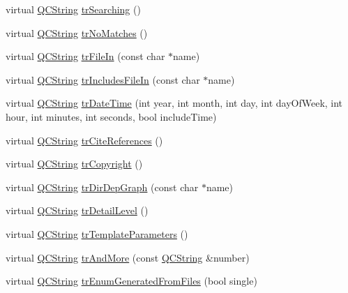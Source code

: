 \begin{DoxyCompactItemize}
\item 
virtual \mbox{\hyperlink{class_q_c_string}{Q\+C\+String}} \mbox{\hyperlink{class_translator_german_a725087ef72c6af5da0bf3072ee09be8b}{tr\+Searching}} ()
\item 
virtual \mbox{\hyperlink{class_q_c_string}{Q\+C\+String}} \mbox{\hyperlink{class_translator_german_a9e9d15260ea7a7f3bf70d315088e75a5}{tr\+No\+Matches}} ()
\item 
virtual \mbox{\hyperlink{class_q_c_string}{Q\+C\+String}} \mbox{\hyperlink{class_translator_german_a398ba2ade80d8a8f9bbef1d91f8406cd}{tr\+File\+In}} (const char $\ast$name)
\item 
virtual \mbox{\hyperlink{class_q_c_string}{Q\+C\+String}} \mbox{\hyperlink{class_translator_german_a98a9d1fbee548039b81bf697cff4519e}{tr\+Includes\+File\+In}} (const char $\ast$name)
\item 
virtual \mbox{\hyperlink{class_q_c_string}{Q\+C\+String}} \mbox{\hyperlink{class_translator_german_a4fa0e3cf73ad2b63a6c475156201408b}{tr\+Date\+Time}} (int year, int month, int day, int day\+Of\+Week, int hour, int minutes, int seconds, bool include\+Time)
\item 
virtual \mbox{\hyperlink{class_q_c_string}{Q\+C\+String}} \mbox{\hyperlink{class_translator_german_a1125598ba94e63c406d69ca023105f68}{tr\+Cite\+References}} ()
\item 
virtual \mbox{\hyperlink{class_q_c_string}{Q\+C\+String}} \mbox{\hyperlink{class_translator_german_a13ee81537aed375dfc8abc9d5e3c380f}{tr\+Copyright}} ()
\item 
virtual \mbox{\hyperlink{class_q_c_string}{Q\+C\+String}} \mbox{\hyperlink{class_translator_german_ae830a2c9591c04c380c62b5739804799}{tr\+Dir\+Dep\+Graph}} (const char $\ast$name)
\item 
virtual \mbox{\hyperlink{class_q_c_string}{Q\+C\+String}} \mbox{\hyperlink{class_translator_german_af424459fd7a15e7a67a74ea2db13d682}{tr\+Detail\+Level}} ()
\item 
virtual \mbox{\hyperlink{class_q_c_string}{Q\+C\+String}} \mbox{\hyperlink{class_translator_german_ab94de36fa089331344a018336ad468d4}{tr\+Template\+Parameters}} ()
\item 
virtual \mbox{\hyperlink{class_q_c_string}{Q\+C\+String}} \mbox{\hyperlink{class_translator_german_a33603e7bd7ea2c17613d4ea92bf2a61b}{tr\+And\+More}} (const \mbox{\hyperlink{class_q_c_string}{Q\+C\+String}} \&number)
\item 
virtual \mbox{\hyperlink{class_q_c_string}{Q\+C\+String}} \mbox{\hyperlink{class_translator_german_ae855091a10623ee2d849d12e3e2af8a7}{tr\+Enum\+Generated\+From\+Files}} (bool single)

\end{DoxyCompactItemize}
